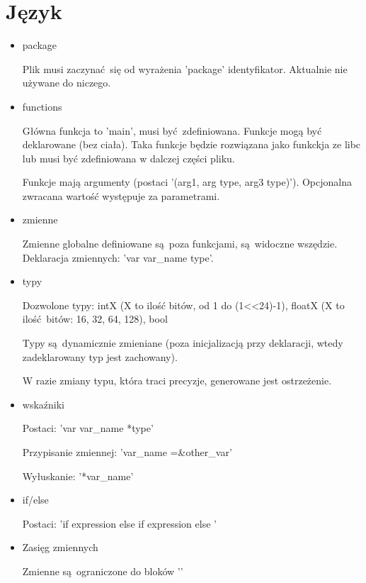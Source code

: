 \documentclass[a4paper,16pt]{article}
\begin{document}
    \section{Język}
    \begin{itemize}
    	\item package
    	
    	Plik musi zaczynać się od wyrażenia 'package' identyfikator.
    	Aktualnie nie używane do niczego.
    	
    	\item functions
    	
    	Główna funkcja to 'main', musi być zdefiniowana.
    	Funkcje mogą być deklarowane (bez ciała). Taka funkcje będzie rozwiązana jako funkckja ze libc lub musi być zdefiniowana w dalczej części pliku.
    	
    	Funkcje mają argumenty (postaci '(arg1, arg type, arg3 type)').
    	Opcjonalna zwracana wartość występuje za parametrami.
    	
    	\item zmienne
    	
    	Zmienne globalne definiowane są poza funkcjami, są widoczne wszędzie.
    	Deklaracja zmiennych: 'var var\_name type'.
    	
    	\item typy
    	
    	Dozwolone typy: intX (X to ilość bitów, od 1 do (1<<24)-1), floatX (X to ilość bitów: 16, 32, 64, 128), bool
    	
    	Typy są dynamicznie zmieniane (poza inicjalizacją przy deklaracji, wtedy zadeklarowany typ jest zachowany).
    	
    	W razie zmiany typu, która traci precyzje, generowane jest ostrzeżenie.
    	
    	\item wskaźniki
    	
    	Postaci: 'var var\_name *type'
    	
    	Przypisanie zmiennej: 'var\_name =\&other\_var'
    	
    	Wyłuskanie: '*var\_name'
		    	    	
    	\item if/else
    	
    	Postaci: 'if expression {} else if expression {} else {}'
    	
    	\item Zasięg zmiennych
    	
    	Zmienne są ograniczone do bloków '{}'
    	
    	
    \end{itemize}
\end{document}
